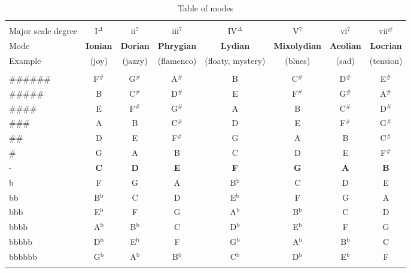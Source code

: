 
\begin{table*}[!h]
	\caption{Table of modes }
	\begin{adjustwidth}{-2.3cm}{}
	\begin{tabular}{lccc cccc}
		\hline \vspace{-0.2cm} \\
		Major scale degree & I$^\Delta$ & ii$^{7}$ & iii$^{7}$ & IV$^\Delta$ & V$^7$ & vi$^{7}$ & vii$^{\varnothing}$ \\
		Mode & \textbf{Ionian} & \textbf{Dorian} & \textbf{Phrygian} & \textbf{Lydian} & \textbf{Mixolydian} & \textbf{Aeolian} & \textbf{Locrian}\\
		Example  & (joy) & (jazzy) & (flamenco) & (floaty, mystery) & (blues) & (sad) & (tension)\\
		\hline \vspace{-0.2cm} \\
		{\scriptsize $\# \# \# \# \# \#$} & F$^\#$ & G$^\#$ & A$^\#$ & B & C$^\#$ & D$^\#$ & E$^\#$ \\
		{\scriptsize $\# \# \# \# \#$}    & B & C$^\#$ & D$^\#$ & E & F$^\#$ & G$^\#$ & A$^\#$\\
		{\scriptsize $\# \# \# \#$}       & E & F$^\#$ & G$^\#$ & A & B & C$^\#$ & D$^\#$\\
		{\scriptsize $\# \# \#$}          & A & B & C$^\#$ & D & E & F$^\#$ & G$^\#$\\
		{\scriptsize $\# \#$}             & D & E & F$^\#$ & G & A & B & C$^\#$\\
		{\scriptsize $\#$}                & G & A & B & C  & D & E & F$^\#$\\
		{\scriptsize -}                   & \textbf{C} & \textbf{D} & \textbf{E} & \textbf{F} & \textbf{G} & \textbf{A} & \textbf{B}\\
		{\scriptsize b}                   & F  & G  & A  & B$^\textrm{b}$ & C  & D  & E\\
		{\scriptsize bb}                  & B$^\textrm{b}$ & C     & D     & E$^\textrm{b}$ & F     & G     & A\\
		{\scriptsize bbb}                 & E$^\textrm{b}$ & F     & G     & A$^\textrm{b}$ & B$^\textrm{b}$ & C     & D\\
		{\scriptsize bbbb}                & A$^\textrm{b}$ & B$^\textrm{b}$ & C     & D$^\textrm{b}$ & E$^\textrm{b}$ & F     & G\\
		{\scriptsize bbbbb}               & D$^\textrm{b}$ & E$^\textrm{b}$ & F     & G$^\textrm{b}$ & A$^\textrm{b}$ & B$^\textrm{b}$ & C\\
		{\scriptsize bbbbbb}              & G$^\textrm{b}$ & A$^\textrm{b}$ & B$^\textrm{b}$ & C$^\textrm{b}$ & D$^\textrm{b}$ & E$^\textrm{b}$ & F\\
		\hline
		\hline \vspace{-0.2cm}
	\end{tabular}
	\label{tab: }
	\end{adjustwidth}
\end{table*}